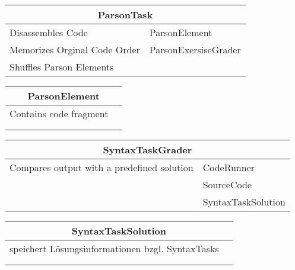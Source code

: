 \documentclass[11pt]{article}
\begin{document}
\begin{table}[h]
\begin{tabularx}{\textwidth}{|X|X|}
\hline
\multicolumn{2}{|c|}{ParsonTask}\\ \hline
Disassembles Code& ParsonElement  \\  \hline
Memorizes Orginal Code Order & ParsonExersiseGrader\\ \hline
Shuffles Parson Elements & \\ \hline
\end{tabularx}

\end{table}


\begin{table}[h]
\begin{tabularx}{\textwidth}{|X|X|}
\hline
\multicolumn{2}{|c|}{ParsonElement}\\ \hline
Contains code fragment& \\  \hline
 & \\ \hline
 & \\ \hline
\end{tabularx}

\end{table}


\begin{table}[h]
\begin{tabularx}{\textwidth}{|X|X|}
\hline
\multicolumn{2}{|c|}{SyntaxTaskGrader}\\ \hline
Compares output with a predefined solution& CodeRunner \\  \hline
 &  SourceCode\\ \hline
 & SyntaxTaskSolution\\ \hline
\end{tabularx}

\end{table}

\begin{table}[h]
\begin{tabularx}{\textwidth}{|X|X|}
\hline
\multicolumn{2}{|c|}{SyntaxTaskSolution}\\ \hline
speichert Lösungsinformationen bzgl. SyntaxTasks& \\  \hline
 &  \\ \hline
 & \\ \hline
\end{tabularx}

\end{table}
\end{document}
